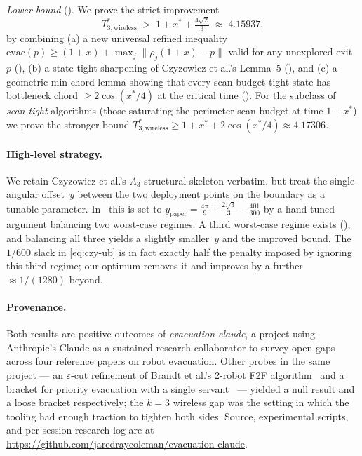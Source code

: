\documentclass[11pt]{article}
\theoremstyle{plain}
\theoremstyle{definition}
\theoremstyle{remark}
\begin{document}
\emph{Lower bound} (). We prove the strict
improvement
\begin{equation}
\label{eq:our-lb}
T^*_{3,\mathrm{wireless}} \;>\; 1 + x^* + \tfrac{4\sqrt 2}{3} \;\approx\; 4.15937,
\end{equation}
by combining (a) a new universal refined inequality $\mathrm{evac}(p)
\ge (1+x) + \max_j \|\rho_j(1+x) - p\|$ valid for any unexplored exit
$p$ (), (b) a state-tight sharpening of
Czyzowicz et al.'s Lemma~5 (), and (c) a geometric
min-chord lemma showing that every scan-budget-tight state has bottleneck
chord $\ge 2\cos(x^*/4)$ at the critical time
(). For the subclass of \emph{scan-tight}
algorithms (those saturating the perimeter scan budget at time $1+x^*$)
we prove the stronger bound $T^*_{3,\mathrm{wireless}} \ge 1 + x^* +
2\cos(x^*/4) \approx 4.17306$.

\paragraph{High-level strategy.} We retain Czyzowicz et al.'s $A_3$
structural skeleton verbatim, but treat the single angular offset~$y$
between the two deployment points on the boundary as a tunable parameter.
In~\cite{czyzowicz2014} this is set to
$y_{\mathrm{paper}} = \frac{4\pi}{9} + \frac{2\sqrt3}{3} - \frac{401}{300}$
by a hand-tuned argument balancing two worst-case regimes. A third
worst-case regime exists (), and balancing
all three yields a slightly smaller~$y$ and the improved bound. The $1/600$
slack in \eqref{eq:czy-ub} is in fact exactly half the penalty imposed by
ignoring this third regime; our optimum removes it and improves by a further
$\approx 1/(1280)$ beyond.

\paragraph{Provenance.} Both results are positive outcomes of
\emph{evacuation-claude}, a project using Anthropic's Claude as a
sustained research collaborator to survey open gaps across four
reference papers on robot evacuation. Other probes in the same
project --- an $\varepsilon$-cut refinement of Brandt et al.'s 2-robot
F2F algorithm~\cite{brandt2020} and a bracket for priority evacuation
with a single servant~\cite{czyzowicz2018priority} --- yielded a null
result and a loose bracket respectively; the $k=3$ wireless gap was the
setting in which the tooling had enough traction to tighten both sides.
Source, experimental scripts, and per-session research log are at
\url{https://github.com/jaredraycoleman/evacuation-claude}.
\end{document}

